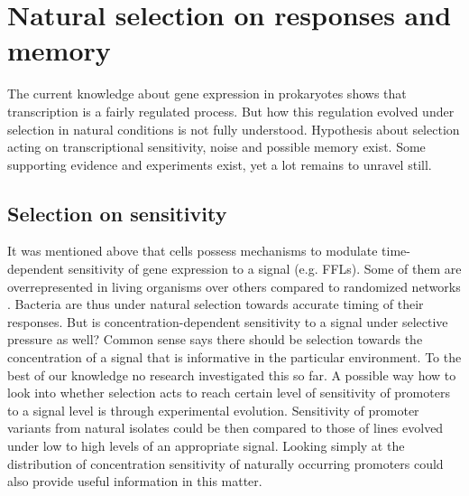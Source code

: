 \section{Natural selection on responses and memory}
The current knowledge about gene expression in prokaryotes shows that transcription is a fairly regulated process.
But how this regulation evolved under selection in natural conditions is not fully understood.
Hypothesis about selection acting on transcriptional sensitivity, noise and possible memory exist.
Some supporting evidence and experiments exist, yet a lot remains to unravel still.

\subsection{Selection on sensitivity}
It was mentioned above that cells possess mechanisms to modulate time-dependent sensitivity of gene expression to a signal (e.g. FFLs).
Some of them are overrepresented in living organisms over others compared to randomized networks \cite{shen2002network, mangan2003structure}.
Bacteria are thus under natural selection towards accurate timing of their responses.
But is concentration-dependent sensitivity to a signal under selective pressure as well?
Common sense says there should be selection towards the concentration of a signal that is informative in the particular environment.
To the best of our knowledge no research investigated this so far.
A possible way how to look into whether selection acts to reach certain level of sensitivity of promoters to a signal level is through experimental evolution.
Sensitivity of promoter variants from natural isolates could be then compared to those of lines evolved under low to high levels of an appropriate signal.
Looking simply at the distribution of concentration sensitivity of naturally occurring promoters could also provide useful information in this matter.

